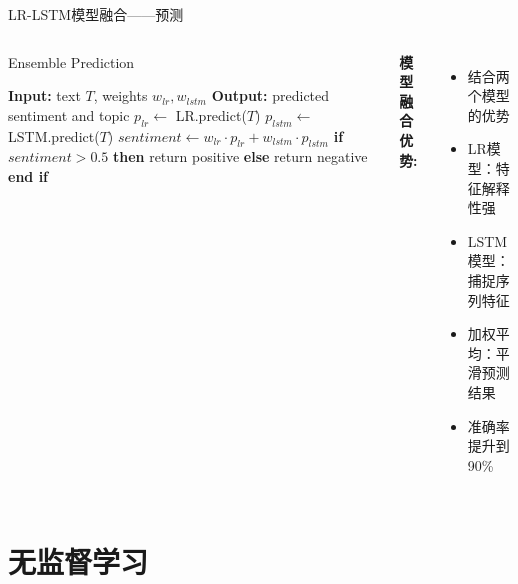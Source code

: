 \documentclass{beamer}
\begin{document}
\begin{frame}[fragile]{LR-LSTM模型融合——预测}
    \begin{columns}[T]
        \begin{algorithm}[H]
        \scriptsize
        \caption{Ensemble Prediction}
        \begin{algorithmic}[1]
        \STATE \textbf{Input:} text $T$, weights $w_{lr}, w_{lstm}$
        \STATE \textbf{Output:} predicted sentiment and topic
        \STATE $p_{lr} \leftarrow$ LR.predict($T$)
        \STATE $p_{lstm} \leftarrow$ LSTM.predict($T$)
        \STATE $sentiment \leftarrow w_{lr} \cdot p_{lr} + w_{lstm} \cdot p_{lstm}$
        \STATE \textbf{if} $sentiment > 0.5$ \textbf{then}
        \STATE \quad return positive
        \STATE \textbf{else}
        \STATE \quad return negative
        \STATE \textbf{end if}
        \end{algorithmic}
        \end{algorithm}
        
        \vspace{0.5cm}
        \textbf{模型融合优势:}
        \begin{itemize}
            \item 结合两个模型的优势
            \item LR模型：特征解释性强
            \item LSTM模型：捕捉序列特征
            \item 加权平均：平滑预测结果
            \item 准确率提升到90\%
        \end{itemize}
    \end{columns}
\end{frame}

\section{无监督学习}
\end{document}
